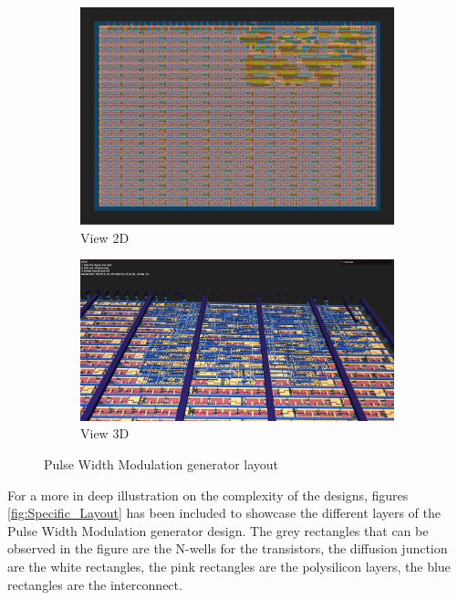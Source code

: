 \begin{figure}[H]
    \centering
    \begin{subfigure}[b]{0.45\textwidth}
        \includegraphics[width=\linewidth]{Pictures/Result_PWM_2D_View.png}
        \caption{View 2D}\label{fig:PWM_2D}
    \end{subfigure}
    \begin{subfigure}[b]{0.45\textwidth}
        \includegraphics[width=\linewidth]{Pictures/Result_PWM_3D_View.png}
        \caption{View 3D}\label{fig:PWM_3D}
    \end{subfigure}
    \caption{Pulse Width Modulation generator layout}\label{fig:PWM}
\end{figure}



For a more in deep illustration on the complexity of the designs, figures \ref*{fig:Specific_Layout} 
has been included to showcase the different layers of the Pulse Width Modulation generator design.
The grey rectangles that can be observed in the figure are the N-wells for the transistors, 
the diffusion junction are the white rectangles, the pink rectangles are the polysilicon layers, 
the blue rectangles are the interconnect. 



